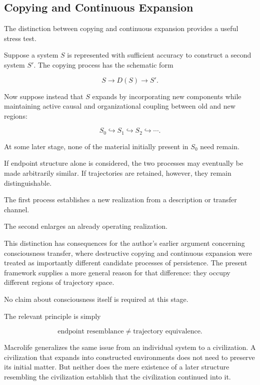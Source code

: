 \documentclass[
  11pt,
  a4paper,
  DIV=12,
  BCOR=0mm,
  parskip=half-
]{scrartcl}
\theoremstyle{definition}
\theoremstyle{plain}
\theoremstyle{remark}
\begin{document}
\subsection{Copying and Continuous Expansion}
\label{sec:copy-expansion}

The distinction between copying and continuous expansion provides a useful
stress test.

Suppose a system \(S\) is represented with sufficient accuracy to construct a
second system \(S'\). The copying process has the schematic form

\[
  S
  \longrightarrow
  D(S)
  \longrightarrow
  S'.
\]

Now suppose instead that \(S\) expands by incorporating new components while
maintaining active causal and organizational coupling between old and new
regions:

\[
  S_0
  \hookrightarrow
  S_1
  \hookrightarrow
  S_2
  \hookrightarrow
  \cdots.
\]

At some later stage, none of the material initially present in \(S_0\) need
remain.

If endpoint structure alone is considered, the two processes may eventually
be made arbitrarily similar. If trajectories are retained, however, they
remain distinguishable.

The first process establishes a new realization from a description or
transfer channel.

The second enlarges an already operating realization.

This distinction has consequences for the author's earlier argument concerning
consciousness transfer, where destructive copying and continuous expansion
were treated as importantly different candidate processes of persistence.
The present framework supplies a more general reason for that difference:
they occupy different regions of trajectory space.

No claim about consciousness itself is required at this stage.

The relevant principle is simply

\[
  \text{endpoint resemblance}
  \neq
  \text{trajectory equivalence}.
\]

Macrolife generalizes the same issue from an individual system to a
civilization. A civilization that expands into constructed environments does
not need to preserve its initial matter. But neither does the mere existence
of a later structure resembling the civilization establish that the
civilization continued into it.
\end{document}
